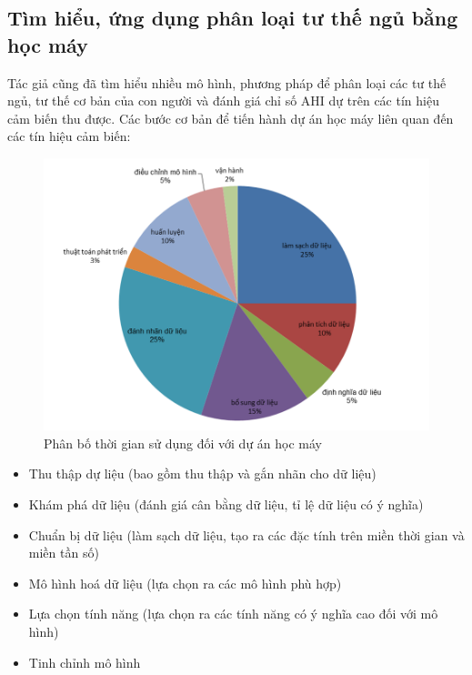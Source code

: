 \subsection{Tìm hiểu, ứng dụng phân loại tư thế ngủ bằng học máy  }

Tác giả cũng đã tìm hiểu nhiều mô hình, phương pháp để phân loại các tư thế ngủ, tư thế cơ bản của con người và đánh giá chỉ số AHI dự trên các tín hiệu cảm biến thu được. Các bước cơ bản để tiến hành dự án học máy liên quan đến các tín hiệu cảm biến:


\begin{figure}[b!]
		\centering
 		\includegraphics[width=1\textwidth]{images/hocmay_time.png}
		\caption{Phân bố thời gian sử dụng đối với dự án học máy}
		\label{hocmay_time}
\end{figure}

\begin{itemize}
    \item Thu thập dự liệu (bao gồm thu thập và gắn nhãn cho dữ liệu)
    
    \item Khám phá dữ liệu (đánh giá cân bằng dữ liệu, tỉ lệ dữ liệu có ý nghĩa)
    
    \item Chuẩn bị dữ liệu (làm sạch dữ liệu, tạo ra các đặc tính trên miền thời gian và miền tần số)
    
    \item Mô hình hoá dữ liệu (lựa chọn ra các mô hình phù hợp)
    
    \item Lựa chọn tính năng (lựa chọn ra các tính năng có ý nghĩa cao đối với mô hình)

    \item Tinh chỉnh mô hình
\end{itemize}


